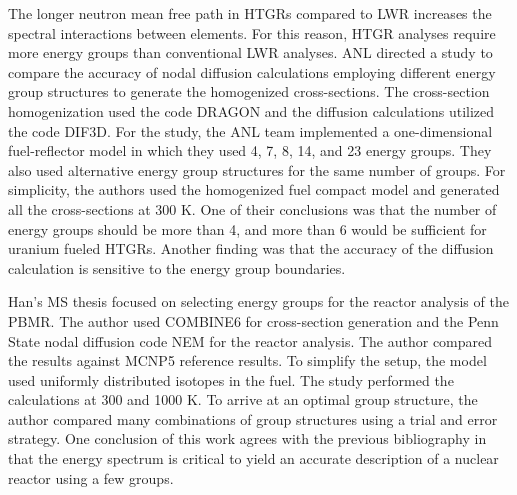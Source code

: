 
The longer neutron mean free path in \glspl{HTGR} compared to \gls{LWR} increases the spectral interactions between elements.
For this reason, \gls{HTGR} analyses require more energy groups than conventional \gls{LWR} analyses.
\gls{ANL} directed a study \cite{lee_status_2006} to compare the accuracy of nodal diffusion calculations employing different energy group structures to generate the homogenized cross-sections.
The cross-section homogenization used the code DRAGON and the diffusion calculations utilized the code DIF3D.
For the study, the ANL team implemented a one-dimensional fuel-reflector model in which they used 4, 7, 8, 14, and 23 energy groups.
They also used alternative energy group structures for the same number of groups.
For simplicity, the authors used the homogenized fuel compact model and generated all the cross-sections at 300 K.
One of their conclusions was that the number of energy groups should be more than 4, and more than 6 would be sufficient for uranium fueled HTGRs.
Another finding was that the accuracy of the diffusion calculation is sensitive to the energy group boundaries.


Han's MS thesis \cite{han_sensitivity_2008} focused on selecting energy groups for the reactor analysis of the \gls{PBMR}.
The author used COMBINE6 \cite{grimesey_combinepc-portable_1994} for cross-section generation and the Penn State nodal diffusion code NEM \cite{bandini_three-dimensional_1990} for the reactor analysis.
The author compared the results against MCNP5 reference results.
To simplify the setup, the model used uniformly distributed isotopes in the fuel.
The study performed the calculations at 300 and 1000 K.
To arrive at an optimal group structure, the author compared many combinations of group structures using a trial and error strategy.
One conclusion of this work agrees with the previous bibliography \cite{gulf_oil_company_nuclear_1973} \cite{duderstadt_nuclear_1976} in that the energy spectrum is critical to yield an accurate description of a nuclear reactor using a few groups.

